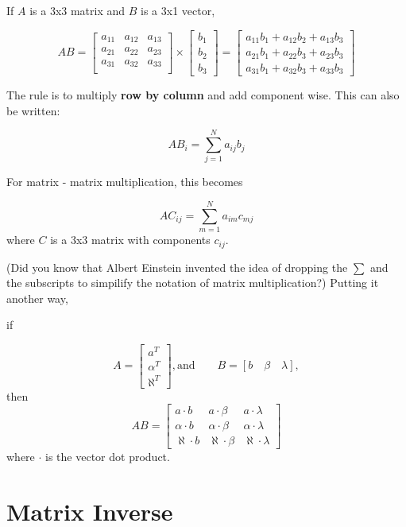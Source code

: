 If $A$ is a 3x3 matrix and $B$ is a 3x1 vector,

\[
AB =
\left[
\begin{array}{ccc}
a_{11}	& a_{12} & a_{13} \\
a_{21}  & a_{22} & a_{23} \\
a_{31}  & a_{32} & a_{33} \\
\end{array}
\right]
\times
\left[
\begin{array}{c}
b_1 \\ b_2 \\ b_3
\end{array}
\right]
= \left[
\begin{array}{c}
a_{11}b_1 + a_{12}b_2 + a_{13}b_3 \\
a_{21}b_1 + a_{22}b_3 + a_{23}b_3 \\
a_{31}b_1 + a_{32}b_3 + a_{33}b_3
\end{array}
\right]
\]

The rule is to multiply {\bf row by column} and add component wise.   This can also be written:

\[
AB_i = \sum_{j=1}^N  a_{ij}b_j
\]

For matrix - matrix multiplication, this becomes

\[
AC_{ij} = \sum_{m=1}^N  a_{im}c_{mj}
\]
where $C$ is a 3x3 matrix with components $c_{ij}$.

(Did you know that Albert Einstein invented the idea of dropping the $\sum$ and the subscripts to simpilify the notation of matrix multiplication?)
Putting it another way,

if

\[
A = \left [
\begin{array}{c}
a^T  \\ \alpha^T \\ \aleph^T
\end{array}
\right],
\mathrm{and} \qquad B = [b \quad \beta \quad \lambda],
\]
then
\[
AB = \left[
\begin{array}{ccc}
a \cdot b           &   a \cdot \beta             &  a  \cdot \lambda  \\
\alpha \cdot b      &   \alpha \cdot \beta        &  \alpha \cdot \lambda  \\
\aleph \cdot b      &   \aleph \cdot \beta        &  \aleph \cdot \lambda
\end{array}
\right]
\]
where $\cdot$ is the vector dot product.

\newpage
\section{Matrix Inverse}

